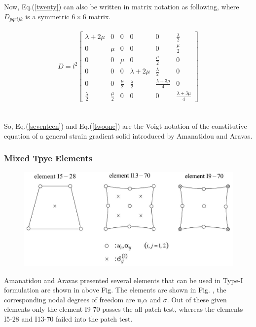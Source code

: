 \documentclass[12pt]{article}
\begin{document}
\\
\\
Now, Eq.(\ref{twenty}) can also be written in matrix notation as following, where $D_{pqrijk}$ is a symmetric $6\times6$ matrix.
\\
\\
\begin{equation}\label{twoone}
D = l^2
\begin{bmatrix}
\lambda + 2\mu & 0 & 0 & 0 & 0 & \frac{\lambda}{2} \\
0 & \mu & 0  & 0  & 0  & \frac{\mu}{2} \\
0 & 0 & \mu & 0  & \frac{\mu}{2}  & 0 \\
0 & 0 & 0 & \lambda + 2\mu & \frac{\lambda}{2} & 0 \\
0 & 0 & \frac{\mu}{2}  & \frac{\lambda}{2} & \frac{\lambda + 3\mu}{4} & 0 \\
 \frac{\lambda}{2} & \frac{\mu}{2} & 0 & 0 & 0 & \frac{\lambda + 3\mu}{4} 
\end{bmatrix}
\end{equation}
\\
\\
So, Eq.(\ref{seventeen}) and Eq.(\ref{twoone}) are the Voigt-notation of the constitutive equation of a general strain gradient solid introduced by Amanatidou and Aravas. 

\newpage
\subsubsection{ Mixed Tpye Elements}
    \begin{figure}[H]
    	\begin{center}
		     \includegraphics[scale=.65]{Element_mixed_type_formulation_E_Amanatidou.JPG}  	
	    \end{center}     
    \end{figure}
Amanatidou and Aravas presented several elements that can be used in Type-I formulation are shown in above Fig. The elements are shown in Fig. , the corresponding nodal degrees of freedom are u,$\alpha$ and $\sigma$. Out of these given elements only the element I9-70 passes the all patch test, whereas the elements I5-28 and I13-70 failed into the patch test.
\\
\end{document}
